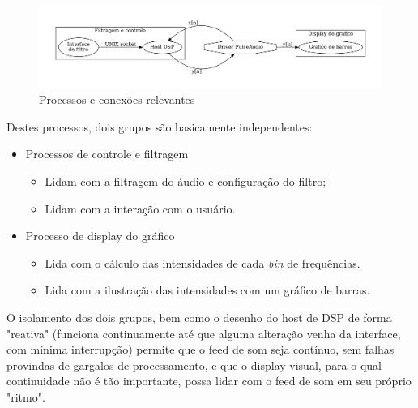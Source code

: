 \begin{figure}[H]
    \centering
    \includegraphics[scale=0.45]{fig/app.pdf}
    \caption{Processos e conexões relevantes}
    \label{fig:app}
\end{figure}

Destes processos, dois grupos são basicamente independentes:

\begin{itemize}
    \item Processos de controle e filtragem
    \begin{itemize}
        \item Lidam com a filtragem do áudio e configuração do filtro;
        \item Lidam com a interação com o usuário.
    \end{itemize}
    \item Processo de display do gráfico
    \begin{itemize}
        \item Lida com o cálculo das intensidades de cada \textit{bin} de frequências.
        \item Lida com a ilustração das intensidades com um gráfico de barras.
    \end{itemize}
\end{itemize}

O isolamento dos dois grupos, bem como o desenho do host de DSP de forma "reativa" (funciona continuamente até que alguma alteração venha da interface, com mínima interrupção) permite que o feed de som seja contínuo, sem falhas provindas de gargalos de processamento, e que o display visual, para o qual continuidade não é tão importante, possa lidar com o feed de som em seu próprio "ritmo".

\break